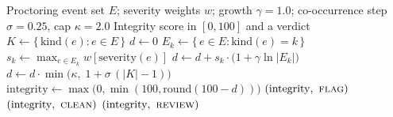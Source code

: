 %

\begin{algorithm}[t]
\caption{Integrity scoring $c(E) \rightarrow \text{integrity}$}
\label{alg:integrity}
\begin{algorithmic}[1]
\Require Proctoring event set $E$; severity weights $w$; growth $\gamma\!=\!1.0$;
         co-occurrence step $\sigma\!=\!0.25$, cap $\kappa\!=\!2.0$
\Ensure  Integrity score in $[0,100]$ and a verdict
\Statex
\State $K \gets \{\,\text{kind}(e) : e \in E\,\}$ 
\State $d \gets 0$
    \State $E_k \gets \{\, e \in E : \text{kind}(e) = k \,\}$
    \State $s_k \gets \max_{e \in E_k} w[\text{severity}(e)]$
    \State $d \gets d + s_k \cdot \bigl(1 + \gamma \ln |E_k|\bigr)$
\EndFor
\State $d \gets d \cdot \min\bigl(\kappa,\; 1 + \sigma\,(|K| - 1)\bigr)$
\State $\text{integrity} \gets \max\bigl(0, \min(100, \text{round}(100 - d))\bigr)$
\Statex
{} 
    \State \Return $(\text{integrity},\ \textsc{flag})$
    \State \Return $(\text{integrity},\ \textsc{clean})$
\Else
    \State \Return $(\text{integrity},\ \textsc{review})$
\EndIf
\end{algorithmic}
\end{algorithm}

